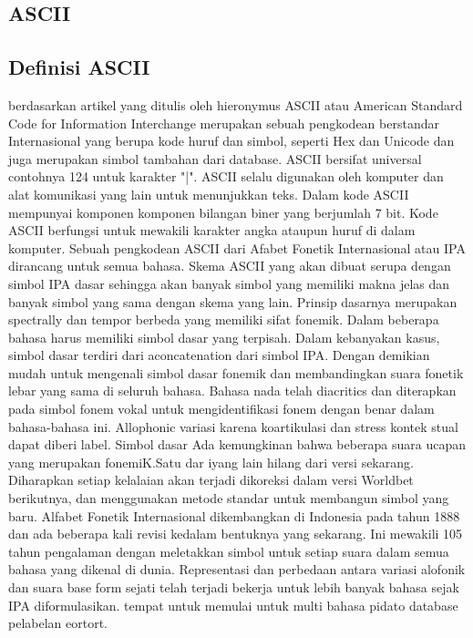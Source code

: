 \begin{enumerate}
	\section{ASCII}
		\subsection{Definisi ASCII}
		berdasarkan artikel yang ditulis oleh hieronymus \cite{hieronymus1993ascii}
	ASCII atau American Standard Code for Information Interchange merupakan sebuah pengkodean berstandar Internasional yang berupa kode huruf dan simbol, seperti Hex dan Unicode dan juga merupakan simbol tambahan dari database. ASCII bersifat universal contohnya 124 untuk karakter "|". ASCII selalu digunakan oleh komputer dan alat komunikasi yang lain untuk menunjukkan teks.
    Dalam kode ASCII mempunyai komponen komponen bilangan biner yang berjumlah 7 bit. Kode ASCII berfungsi untuk mewakili karakter angka ataupun huruf di dalam komputer. Sebuah pengkodean ASCII dari Afabet Fonetik Internasional atau IPA dirancang untuk semua bahasa. Skema ASCII yang akan dibuat serupa dengan simbol IPA dasar sehingga akan banyak simbol yang memiliki makna jelas dan banyak simbol yang sama dengan skema yang lain. Prinsip dasarnya merupakan spectrally dan tempor berbeda yang memiliki sifat fonemik.
    Dalam beberapa bahasa harus memiliki simbol dasar yang terpisah. Dalam kebanyakan kasus, simbol dasar terdiri dari aconcatenation dari simbol IPA. Dengan demikian mudah untuk mengenali simbol dasar fonemik dan membandingkan suara fonetik lebar yang sama di seluruh bahasa. Bahasa nada telah diacritics dan diterapkan pada simbol fonem vokal untuk mengidentifikasi fonem dengan benar dalam bahasa-bahasa ini. Allophonic variasi karena koartikulasi dan stress kontek stual dapat diberi label.
	Simbol dasar Ada kemungkinan bahwa beberapa suara ucapan yang merupakan fonemiK.Satu dar iyang lain hilang dari versi sekarang. Diharapkan setiap kelalaian akan terjadi dikoreksi dalam versi Worldbet berikutnya, dan menggunakan metode standar untuk membangun simbol yang baru. Alfabet Fonetik Internasional dikembangkan di Indonesia pada tahun 1888 dan ada beberapa kali revisi kedalam bentuknya yang sekarang. Ini mewakili 105 tahun pengalaman dengan meletakkan simbol untuk setiap suara dalam semua bahasa yang dikenal di dunia. 
	Representasi dan perbedaan antara variasi alofonik dan suara base form sejati telah terjadi
	bekerja untuk lebih banyak bahasa sejak IPA diformulasikan. 
	tempat untuk memulai untuk multi bahasa pidato database pelabelan eortort.

\end{enumerate}
